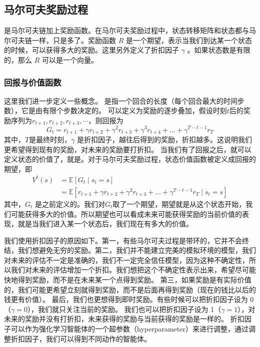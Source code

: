 \subsection{马尔可夫奖励过程} 

是马尔可夫链加上奖励函数。在马尔可夫奖励过程中，状态转移矩阵和状态都与马尔可夫链一样，只是多了。奖励函数 $R$ 是一个期望，表示当我们到达某一个状态的时候，可以获得多大的奖励。这里另外定义了折扣因子 $\gamma$ 。如果状态数是有限的，那么 $R$ 可以是一个向量。

\subsubsection{回报与价值函数}

这里我们进一步定义一些概念。 是指一个回合的长度（每个回合最大的时间步数），它是由有限个步数决定的。
可以定义为奖励的逐步叠加，假设时刻$t$后的奖励序列为$r_{t+1},r_{t+2},r_{t+3},\cdots$，则回报为
\begin{equation}
  G_{t}=r_{t+1}+\gamma r_{t+2}+\gamma^{2} r_{t+3}+\gamma^{3} r_{t+4}+\ldots+\gamma^{T-t-1} r_{T}
  \label{eq:}
\end{equation}
其中，$T$是最终时刻，$\gamma$ 是折扣因子，越往后得到的奖励，折扣越多。这说明我们更希望得到现有的奖励，对未来的奖励要打折扣。
当我们有了回报之后，就可以定义状态的价值了，就是。对于马尔可夫奖励过程，状态价值函数被定义成回报的期望，即
\begin{equation}
  \begin{aligned}
    V^{t}(s) &=\mathbb{E}\left[G_{t} \mid s_{t}=s\right] \\
    &=\mathbb{E}\left[r_{t+1}+\gamma r_{t+2}+\gamma^{2} r_{t+3}+\ldots+\gamma^{T-t-1} r_{T} \mid s_{t}=s\right]
    \end{aligned}
  \label{eq:}
\end{equation}
其中，$G_t$ 是之前定义的。我们对$G_t$取了一个期望，期望就是从这个状态开始，我们可能获得多大的价值。所以期望也可以看成未来可能获得奖励的当前价值的表现，就是当我们进入某一个状态后，我们现在有多大的价值。

我们使用折扣因子的原因如下。第一，有些马尔可夫过程是带环的，它并不会终结，我们想避免无穷的奖励。第二，我们并不能建立完美的模拟环境的模型，我们对未来的评估不一定是准确的，我们不一定完全信任模型，因为这种不确定性，所以我们对未来的评估增加一个折扣。我们想把这个不确定性表示出来，希望尽可能快地得到奖励，而不是在未来某一个点得到奖励。
第三，如果奖励是有实际价值的，我们可能更希望立刻就得到奖励，而不是后面再得到奖励（现在的钱比以后的钱更有价值）。
最后，我们也更想得到即时奖励。有些时候可以把折扣因子设为 0（$\gamma=0$），我们就只关注当前的奖励。
我们也可以把折扣因子设为 1（$\gamma=1$），对未来的奖励并没有打折扣，未来获得的奖励与当前获得的奖励是一样的。
折扣因子可以作为强化学习智能体的一个超参数（hyperparameter）来进行调整，通过调整折扣因子，我们可以得到不同动作的智能体。

